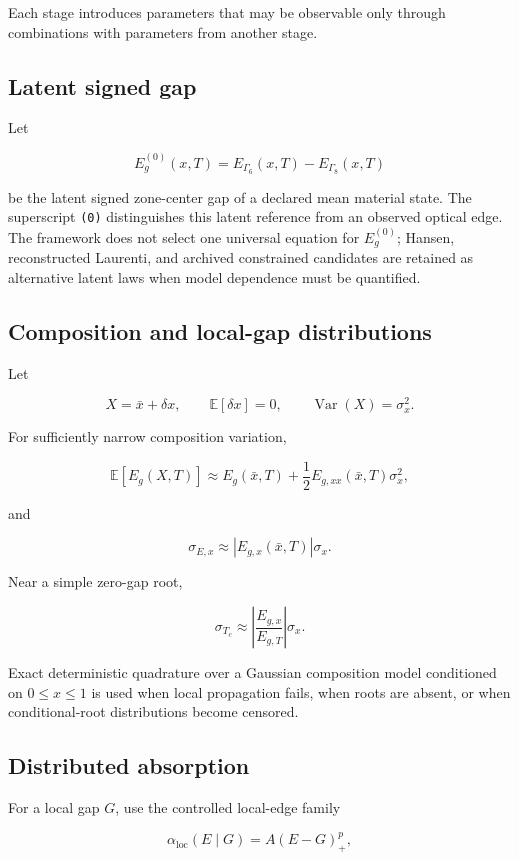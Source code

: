 \documentclass[12pt]{article}
\begin{document}
Each stage introduces parameters that may be observable only through combinations with parameters from another stage.

\subsection{Latent signed gap}

Let

\[
E_g^{(0)}(x,T)=E_{\Gamma_6}(x,T)-E_{\Gamma_8}(x,T)
\]

be the latent signed zone-center gap of a declared mean material state. The superscript \texttt{(0)} distinguishes this latent reference from an observed optical edge. The framework does not select one universal equation for $E_g^{(0)}$; Hansen, reconstructed Laurenti, and archived constrained candidates are retained as alternative latent laws when model dependence must be quantified.

\subsection{Composition and local-gap distributions}

Let

\[
X=\bar x+\delta x,
\qquad
\mathbb E[\delta x]=0,
\qquad
\operatorname{Var}(X)=\sigma_x^2.
\]

For sufficiently narrow composition variation,

\[
\mathbb E[E_g(X,T)]
\approx
E_g(\bar x,T)+\frac12E_{g,xx}(\bar x,T)\sigma_x^2,
\]

and

\[
\sigma_{E,x}\approx |E_{g,x}(\bar x,T)|\sigma_x.
\]

Near a simple zero-gap root,

\[
\sigma_{T_c}
\approx
\left|\frac{E_{g,x}}{E_{g,T}}\right|\sigma_x.
\]

Exact deterministic quadrature over a Gaussian composition model conditioned on $0\le x\le1$ is used when local propagation fails, when roots are absent, or when conditional-root distributions become censored.

\subsection{Distributed absorption}

For a local gap $G$, use the controlled local-edge family

\[
\alpha_{\mathrm{loc}}(E\mid G)=A(E-G)_+^p,
\]
\end{document}
